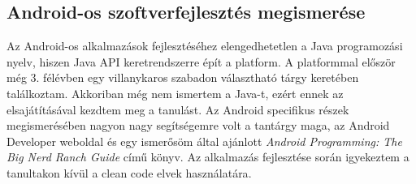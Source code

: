 \documentclass[../main.tex]{subfiles}
\begin{document}
    \subsection{Android-os szoftverfejlesztés megismerése}
        Az Android-os alkalmazások fejlesztéséhez elengedhetetlen a Java programozási nyelv, hiszen Java API keretrendszerre épít a platform. A platformmal először még 3. félévben egy villanykaros szabadon választható tárgy keretében találkoztam. Akkoriban még nem ismertem a Java-t, ezért ennek az elsajátításával kezdtem meg a tanulást\cite{b_java}. Az Android specifikus részek megismerésében nagyon nagy segítségemre volt a tantárgy maga, az Android Developer weboldal\cite{android_guides} és egy ismerősöm által ajánlott \textit{Android Programming: The Big Nerd Ranch Guide} című könyv\cite{b_android2}. Az alkalmazás fejlesztése során igyekeztem a tanultakon kívül a clean code elvek használatára\cite{android_clean_code}.
        
        
            
            
\end{document}
